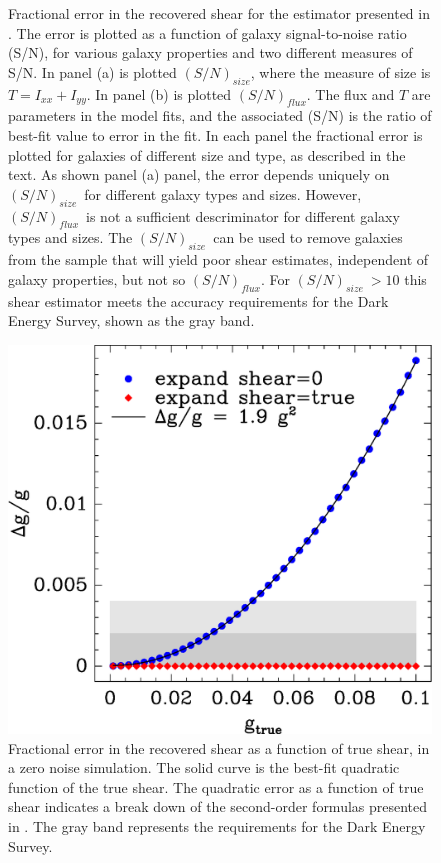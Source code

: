 \documentclass[12pt,preprint]{aastex}
\newcommand{\Tsn}{$(S/N)_{size}$}
\newcommand{\fsn}{$(S/N)_{flux}$}
\begin{document}
\begin{figure}[p]
 \caption{ Fractional error in the recovered shear for the estimator presented
     in \cite{ba13}.  The error is plotted as a
     function of galaxy signal-to-noise ratio (S/N), for various galaxy
     properties and two different measures of S/N.  In panel (a) is
     plotted \Tsn, where the measure of size is $T=I_{xx} + I_{yy}$.  In 
     panel (b) is plotted \fsn.  The flux and $T$ are parameters in the model
     fits, and the associated (S/N) is the ratio of best-fit value to error in
     the fit.  In each panel the fractional error is plotted for galaxies of
     different size and type, as described in the text.  As shown panel (a)
     panel, the error depends uniquely on \Tsn\ for different galaxy types and
     sizes.  However, \fsn\ is not a sufficient descriminator for different
     galaxy types and sizes.  The \Tsn\ can be used to remove galaxies from the
     sample that will yield poor shear estimates, independent of galaxy
     properties, but not so \fsn.  For \Tsn$~ > 10$ this shear estimator meets
 the accuracy requirements for the Dark Energy Survey, shown as the gray band.
 \label{fig:fracerr}}

\end{figure}

\begin{figure}[t] \centering
 \centering 
 \includegraphics[scale=0.6]{figures/fracerr-vs-shear.eps}

 \caption{Fractional error in the recovered shear as a function of true shear,
     in a zero noise simulation.  The solid curve is the best-fit quadratic
     function of the true shear.  The quadratic error as a function of true
     shear indicates a break down of the second-order formulas presented in
 \cite{ba13}. The gray band represents the requirements for the Dark Energy
 Survey. \label{fig:nonoise}}

\end{figure}
\end{document}

